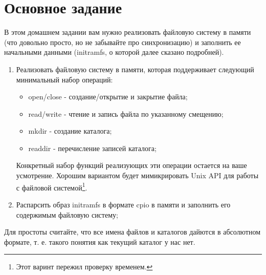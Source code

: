 \section{Основное задание}

В этом домашнем задании вам нужно реализовать файловую систему в памяти (что
довольно просто, но не забывайте про синхронизацию) и заполнить ее начальными
данными (initramfs, о которой далее сказано подробней).

\begin{enumerate}
  \item Реализовать файловую систему в памяти, которая поддерживает следующий
        минимальный набор операций:
        \begin{itemize}
          \item open/close - создание/открытие и закрытие файла;
          \item read/write - чтение и запись файла по указанному смещению;
          \item mkdir - создание каталога;
          \item readdir - перечисление записей каталога;
        \end{itemize}
        Конкретный набор функций реализующих эти операции остается на ваше
        усмотрение. Хорошим вариантом будет мимикрировать Unix API для работы
        с файловой системой\footnote{Этот варинт пережил проверку временем.}.
  \item Распарсить образ initramfs в формате cpio в памяти и заполнить его
        содержимым файловую систему;
\end{enumerate}

Для простоты считайте, что все имена файлов и каталогов дайются в абсолютном
формате, т. е. такого понятия как текущий каталог у нас нет.
